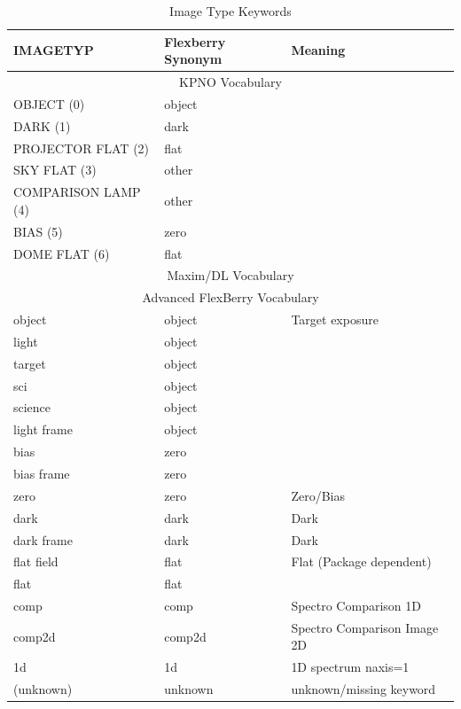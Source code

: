 \documentclass[letter,11pt,oneside]{article}
\begin{document}
\begin{table}[h!]
\centering
\begin{tabular}{ l  l  l }
\hline
IMAGETYP         & Flexberry Synonym   & Meaning            \\
\hline
\multicolumn{3}{c}{KPNO Vocabulary}                         \\
\hline
OBJECT (0)           & object          &                    \\
DARK (1)             & dark            &                    \\
PROJECTOR FLAT (2)   & flat            &                    \\
SKY FLAT (3)         & other           &                    \\
COMPARISON LAMP (4)  & other           &                    \\
BIAS (5)             & zero            &                    \\
DOME FLAT (6)        & flat            &                    \\
\hline
\multicolumn{3}{c}{Maxim/DL Vocabulary}                     \\
\hline
\multicolumn{3}{c}{Advanced FlexBerry Vocabulary}           \\
object               & object          & Target exposure    \\
light                & object          &                    \\
target               & object          &                    \\
sci                  & object          &                    \\
science              & object          &                    \\
light frame          & object          &                    \\
bias                 & zero            &                    \\
bias frame           & zero            &                    \\
zero                 & zero            & Zero/Bias          \\
dark                 & dark            & Dark               \\
dark frame           & dark            & Dark               \\
flat field           & flat            & Flat (Package dependent) \\
flat                 & flat            &                    \\
comp                 & comp            & Spectro Comparison 1D \\
comp2d               & comp2d          & Spectro Comparison Image 2D \\
1d                   & 1d              & 1D spectrum naxis=1 \\
(unknown)            & unknown         & unknown/missing keyword \\
\hline
\end{tabular}
\caption{Image Type Keywords}
\label{table:ImageTypeKeywords}
\end{table}
\clearpage
\end{document}
